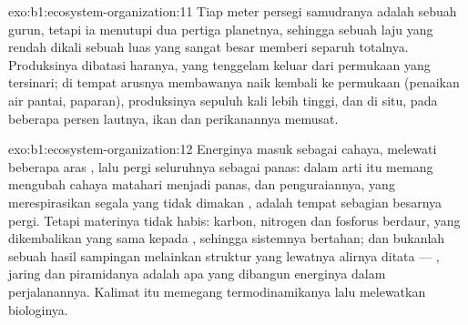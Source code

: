 \begin{solution}{exo:b1:ecosystem-organization:11}
Tiap meter persegi samudranya adalah sebuah gurun, tetapi ia menutupi
dua pertiga planetnya, sehingga sebuah laju yang rendah dikali sebuah
luas yang sangat besar memberi separuh totalnya. Produksinya dibatasi
haranya, yang tenggelam keluar dari permukaan yang tersinari; di
tempat arusnya membawanya naik kembali ke permukaan (penaikan air
pantai, paparan), produksinya sepuluh kali lebih tinggi, dan di
situ, pada beberapa persen lautnya, ikan dan perikanannya memusat.
\end{solution}

\begin{solution}{exo:b1:ecosystem-organization:12}
Energinya masuk sebagai cahaya, melewati beberapa aras , lalu
pergi seluruhnya sebagai panas: dalam arti itu  memang
mengubah cahaya matahari menjadi panas, dan penguraiannya, yang
merespirasikan segala yang tidak dimakan , adalah tempat
sebagian besarnya pergi. Tetapi materinya tidak habis: karbon,
nitrogen dan fosforus berdaur, yang dikembalikan  yang sama
kepada , sehingga sistemnya bertahan; dan 
bukanlah sebuah hasil sampingan melainkan struktur yang lewatnya
alirnya ditata --- , jaring dan piramidanya adalah apa yang
dibangun energinya dalam perjalanannya. Kalimat itu memegang
termodinamikanya lalu melewatkan biologinya.
\end{solution}


